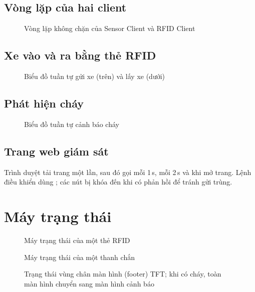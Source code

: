 \subsection{Vòng lặp của hai client}
\begin{figure}[H]
\centering
{}
\caption{Vòng lặp không chặn của Sensor Client và RFID Client}\label{fig:clientloops}
\end{figure}

\subsection{Xe vào và ra bằng thẻ RFID}
\begin{figure}[H]
\centering
{}
\caption{Biểu đồ tuần tự gửi xe (trên) và lấy xe (dưới)}\label{fig:seq-rfid}
\end{figure}

\subsection{Phát hiện cháy}
\begin{figure}[H]
\centering
{}
\caption{Biểu đồ tuần tự cảnh báo cháy}\label{fig:seq-fire}
\end{figure}

\subsection{Trang web giám sát}
Trình duyệt tải trang một lần, sau đó gọi  mỗi 1\,s,
 mỗi 2\,s và  khi mở trang. Lệnh điều
khiển dùng ; các nút bị khóa đến khi có phản hồi để tránh gửi trùng.

\section{Máy trạng thái}\label{sec:fsm}
\begin{figure}[H]
\centering
{}
\caption{Máy trạng thái của một thẻ RFID}\label{fig:fsm-card}
\end{figure}

\begin{figure}[H]
\centering
{}
\caption{Máy trạng thái của một thanh chắn}\label{fig:fsm-gate}
\end{figure}

\begin{figure}[H]
\centering
{}
\caption{Trạng thái vùng chân màn hình (footer) TFT; khi có cháy, toàn màn hình chuyển sang màn hình cảnh báo}\label{fig:fsm-footer}
\end{figure}


